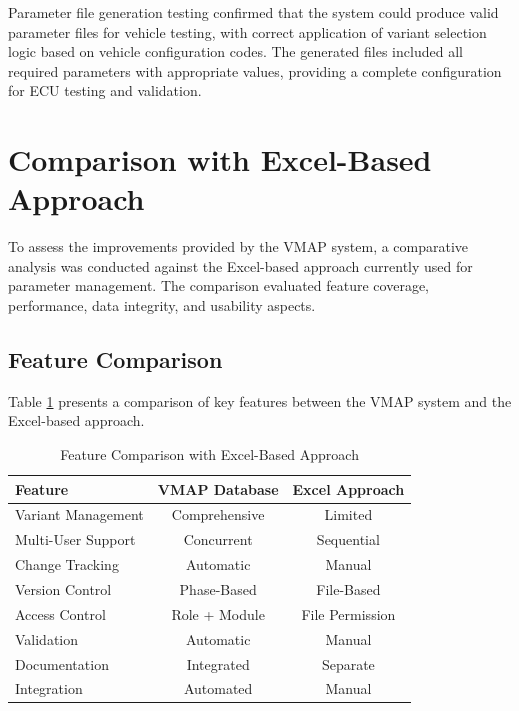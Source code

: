 Parameter file generation testing confirmed that the system could produce valid parameter files for vehicle testing, with correct application of variant selection logic based on vehicle configuration codes. The generated files included all required parameters with appropriate values, providing a complete configuration for ECU testing and validation.

\section{Comparison with Excel-Based Approach}
\label{sec:comparison-with-excel}

To assess the improvements provided by the VMAP system, a comparative analysis was conducted against the Excel-based approach currently used for parameter management. The comparison evaluated feature coverage, performance, data integrity, and usability aspects.

\subsection{Feature Comparison}
\label{subsec:feature-comparison}

Table \ref{tab:feature-comparison} presents a comparison of key features between the VMAP system and the Excel-based approach.

\begin{table}[h]
\centering
\caption{Feature Comparison with Excel-Based Approach}
\label{tab:feature-comparison}
\begin{tabular}{|l|c|c|}
\hline
\textbf{Feature} & \textbf{VMAP Database} & \textbf{Excel Approach} \\
\hline
Variant Management & Comprehensive & Limited \\
\hline
Multi-User Support & Concurrent & Sequential \\
\hline
Change Tracking & Automatic & Manual \\
\hline
Version Control & Phase-Based & File-Based \\
\hline
Access Control & Role + Module & File Permission \\
\hline
Validation & Automatic & Manual \\
\hline
Documentation & Integrated & Separate \\
\hline
Integration & Automated & Manual \\
\hline
\end{tabular}
\end{table}

